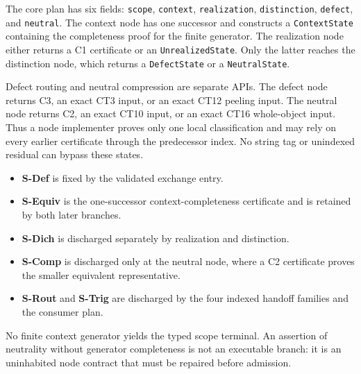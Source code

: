 \documentclass[
  11pt,
]{article}
\providecommand{\tightlist}{%
  \setlength{\itemsep}{0pt}\setlength{\parskip}{0pt}}
\theoremstyle{definition}
\begin{document}
The core plan has six fields: \texttt{scope}, \texttt{context},
\texttt{realization}, \texttt{distinction}, \texttt{defect}, and
\texttt{neutral}.  The context node has one successor and constructs a
\texttt{ContextState} containing the completeness proof for the finite
generator.  The realization node either returns a C1 certificate or an
\texttt{UnrealizedState}.  Only the latter reaches the distinction node,
which returns a \texttt{DefectState} or a \texttt{NeutralState}.

Defect routing and neutral compression are separate APIs.  The defect node
returns C3, an exact CT3 input, or an exact CT12 peeling input.  The neutral node
returns C2, an exact CT10 input, or an exact CT16 whole-object input.  Thus a node
implementer proves only one local classification and may rely on every earlier
certificate through the predecessor index.  No string tag or unindexed
residual can bypass these states.

\begin{itemize}
\tightlist
\item \textbf{S-Def} is fixed by the validated exchange entry.
\item \textbf{S-Equiv} is the one-successor context-completeness certificate and is retained by both later branches.
\item \textbf{S-Dich} is discharged separately by realization and distinction.
\item \textbf{S-Comp} is discharged only at the neutral node, where a C2 certificate proves the smaller equivalent representative.
\item \textbf{S-Rout} and \textbf{S-Trig} are discharged by the four indexed handoff families and the consumer plan.
\end{itemize}

No finite context generator yields the typed scope terminal.  An assertion of
neutrality without generator completeness is not an executable branch: it is
an uninhabited node contract that must be repaired before admission.
\end{document}
